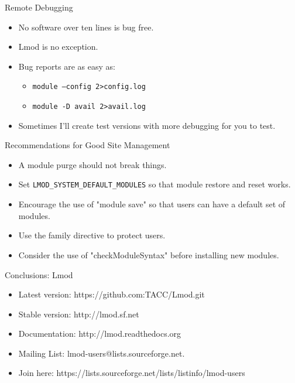 \documentclass[dvipsnames,aspectratio=169]{beamer}
\begin{document}
\begin{frame}{Remote Debugging}
  \begin{itemize}
    \item No software over ten lines is bug free.
    \item Lmod is no exception.
    \item Bug reports are as easy as:
      \begin{itemize}
        \item \texttt{module --config  2\textgreater  config.log}
        \item \texttt{module -D avail  2\textgreater  avail.log}
      \end{itemize}
    \item Sometimes I'll create test versions with more debugging for
      you to test.
  \end{itemize}
\end{frame}

\begin{frame}{Recommendations for Good Site Management}
  \begin{itemize}
    \item A module purge should not break things.
    \item Set \texttt{LMOD\_SYSTEM\_DEFAULT\_MODULES} so that module
      restore and reset works.
    \item Encourage the use of "module save" so that users can have a
      default set of modules.
    \item Use the family directive to protect users.
    \item Consider the use of "checkModuleSyntax" before installing new modules.
  \end{itemize}
\end{frame}

\begin{frame}{Conclusions: Lmod}
  \begin{itemize}
    \item Latest version: https://github.com:TACC/Lmod.git
    \item Stable version: http://lmod.sf.net
    \item Documentation:  http://lmod.readthedocs.org
    \item Mailing List:   lmod-users@lists.sourceforge.net.
    \item Join here: https://lists.sourceforge.net/lists/listinfo/lmod-users
  \end{itemize}
\end{frame}


%
\end{document}
